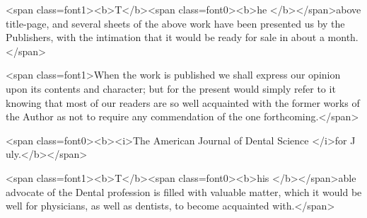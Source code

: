 <span class=font1><b>T</b><span class=font0><b>he </b></span>above title-page, and several sheets of the above work have
been presented us by the Publishers, with the intimation that it would
be ready for sale in about a month.</span>

<span class=font1>When the work is published we shall express our opinion upon its
contents and character; but for the present would simply refer to it
knowing that most of our readers are so well acquainted with the former
works of the Author as not to require any commendation of the one
forthcoming.</span>

<span class=font0><b><i>The American Journal of Dental Science </i>for J uly.</b></span>

<span class=font1><b>T</b><span class=font0><b>his </b></span>able advocate of the Dental profession is filled with valuable
matter, which it would be well for physicians, as well as dentists, to
become acquainted with.</span>
